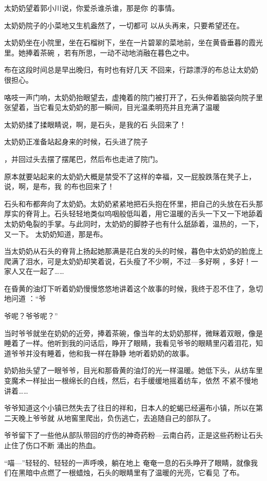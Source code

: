\documentclass{article}
\begin{document}
太奶奶望着郭小川说，你爱杀谁杀谁，那是你
的事情。 

太奶奶院子的小菜地又生机盎然了，一切都可
以从头再来，只要希望还在。 

太奶奶坐在小院里，坐在石榴树下，坐在一片碧翠的菜地前，坐在黄昏垂暮的霞光里。她捧着茶碗
，若有所思，一动不动地消融在暮色之中。 

布在这段时间总是早出晚归，有时也有好几天
不回来，行踪漂浮的布总让太奶奶很担心。 

咯吱一声门响，太奶奶抬眼望去，虚掩着的院门被打开了，石头伸着脑袋向院子里张望着，当它看见太奶奶的那一瞬间，目光温柔明亮并且充满了温暖

太奶奶揉了揉眼睛说，啊，是石头，是我的石
头回来了！ 

太奶奶正准备站起身来的时候，石头进了院子
\newpage

，并回过头去摆了摆尾巴，然后布也走进了院门。 

原本就要站起来的太奶奶大概是禁受不了这样的幸福，又一屁股跌落在凳子上，说，啊，是布，我
的布也回来了！ 

石头和布都奔向了太奶奶。太奶奶紧紧地把石头抱在怀里，把自己的头放在石头那厚实的脊背上。石头轻轻地类似呜咽般低叫着，用它温暖的舌头一下又一下地舔着太奶奶龟裂的手掌。与此同时，太奶奶的脚脖子也有什么舐舔着，温热的，一下，又一下。
太奶奶知道，那是布。 

当太奶奶从石头的脊背上扬起她那满是花白发的头的时候，暮色中太奶奶的脸庞上爬满了泪水，可是太奶奶却笑着说，石头瘦了不少啊，不过—多好啊
，多好！一家人又在一起了…… 

在昏黄的油灯下听着奶奶慢慢悠悠地讲着这个故事的时候，我终于忍不住了，急切地问道 ：“爷

\newpage
爷呢？爷爷呢？” 

当时爷爷就坐在奶奶的近旁，捧着茶碗，像当年的太奶奶那样，微眯着双眼，像是睡着了一样。他听到我的问话后，睁开了眼睛，我看见爷爷的眼睛里闪着泪花，知道爷爷并没有睡着，他和我一样在静静
地听着奶奶的故事。 

奶奶抬头望了一眼爷爷，目光和那昏黄的油灯的光一样温暖。她低下头，从纺车里变魔术一样扯出一根绵长的白线，然后，右手缓缓地摇着纺车，依然
不紧不慢地讲着…… 

爷爷知道这个小镇已然失去了往日的祥和，日本人的蛇蝎已经遍布小镇，所以在第二天晚上爷爷就
从地窖里爬出，负伤逃亡，去追随自己的部队了。 

爷爷留下了一些他从部队带回的疗伤的神奇药粉—云南白药，正是这些药粉让石头止住了伤口不断
涌出的热血。 

“喵—”轻轻的、轻轻的一声呼唤，躺在地上
\newpage
奄奄一息的石头睁开了眼睛，就像我们在黑暗中点燃了一根蜡烛，石头的眼睛里有了温暖的光亮，它看见
了布。 
\end{document}
